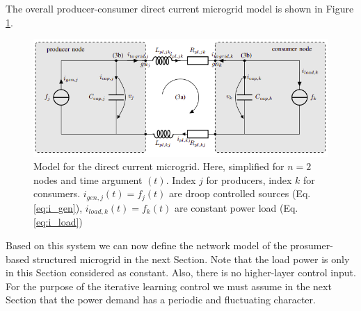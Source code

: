 The overall producer-consumer direct current microgrid model is shown in Figure
 \ref{fig:prod-cons-micro}. 
\begin{figure}[h]
\centering
    \includegraphics[scale=0.5]{pictures/prod-cons-microgrid.png}
    \caption{Model for the direct current microgrid. Here, simplified for $n = 2$ nodes and time argument $(t)$. Index $j$ for producers, index $k$ for consumers. $i_{gen,j}(t) = f_{j}(t)$ are droop controlled sources (Eq. \ref{eq:i_gen}), $i_{load,k}(t) = f_k(t)$ are constant power load (Eq. \ref{eq:i_load}) \cite{lia_stability}}
    \label{fig:prod-cons-micro}
\end{figure}
Based on this system we can now define the network model of the prosumer-based structured microgrid in the next Section.
Note that the load power is only in this Section considered as constant. Also, there is no higher-layer control input. For the purpose of the iterative learning control we must assume in the next Section that the power demand has a periodic and fluctuating character. 
